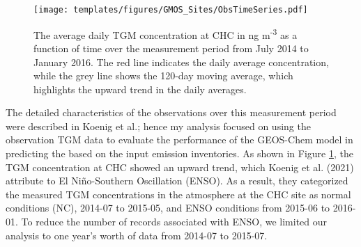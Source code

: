 \begin{figure}[H]
  \texttt{[image: templates/figures/GMOS\_Sites/ObsTimeSeries.pdf]}
 
  \caption[The average daily TGM concentration at CHC in ng m\textsuperscript{-3} as a function of time over the measurement period from July 2014 to January 2016.]{The average daily TGM concentration at CHC in ng m\textsuperscript{-3} as a function of time over the measurement period from July 2014 to January 2016\cite{koenig_seasonal_2021}. The red line indicates the daily average concentration, while the grey line shows the 120-day moving average, which highlights the upward trend in the daily averages.}
  \label{fig:chc_time_series}
  \centering
\end{figure}
\FloatBarrier
\begin{flushleft}

The detailed characteristics of the observations over this measurement period were described in Koenig et al.\cite{koenig_seasonal_2021}; hence my analysis focused on using the observation TGM data to evaluate the performance of the GEOS-Chem model in predicting the \hg based on the input \hg emission inventories. As shown in Figure \ref{fig:chc_time_series}, the TGM concentration at CHC showed an upward trend, which Koenig et al. (2021) attribute to El Ni\~no-Southern Oscillation (ENSO)\cite{koenig_seasonal_2021}. As a result, they categorized the measured TGM concentrations in the atmosphere at the CHC site as normal conditions (NC), 2014-07 to 2015-05, and ENSO conditions from 2015-06 to 2016-01. To reduce the number of records associated with ENSO, we limited our analysis to one year's worth of data from 2014-07 to 2015-07.
\end{flushleft}

